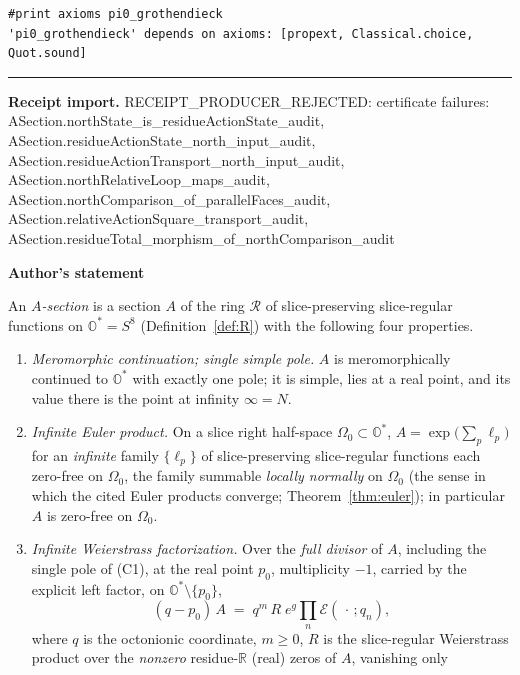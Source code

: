 \documentclass[11pt]{article}
\newcommand{\OO}{\mathbb{O}}
\newcommand{\RR}{\mathbb{R}}
\theoremstyle{plain}
\theoremstyle{definition}
\theoremstyle{remark}
\begin{document}
\begin{tcolorbox}[provenancecard,title={43. Lemma - \$\textbackslash{}pi\_0\$ of a Grothendieck construction},title after break={43. Lemma - \$\textbackslash{}pi\_0\$ of a Grothendieck construction (continued)}]
\begin{Verbatim}[breaklines=true,breakanywhere=true,fontsize=\small]
#print axioms pi0_grothendieck
'pi0_grothendieck' depends on axioms: [propext, Classical.choice, Quot.sound]
\end{Verbatim}
\medskip\hrule\medskip
\textbf{Receipt import.} \textcolor{KgtRed}{RECEIPT\_PRODUCER\_REJECTED: certificate failures: ASection.northState\_is\_residueActionState\_audit, ASection.residueActionState\_north\_input\_audit, ASection.residueActionTransport\_north\_input\_audit, ASection.northRelativeLoop\_maps\_audit, ASection.northComparison\_of\_parallelFaces\_audit, ASection.relativeActionSquare\_transport\_audit, ASection.residueTotal\_morphism\_of\_northComparison\_audit}
\end{tcolorbox}
\medskip
\begin{tcolorbox}[provenancecard,title={44. Definition - \$A\$-sections},title after break={44. Definition - \$A\$-sections (continued)}]
\textbf{Author's statement}\par
An \emph{$A$-section} is a section $A$ of the ring $\mathcal R$ of slice-preserving
slice-regular functions on $\OO^{*}=S^8$ \textup{(Definition~\ref{def:R})} with the following
four properties.
\begin{enumerate}[label=\textup{(C\arabic*)},leftmargin=3.2em]
\item \emph{Meromorphic continuation; single simple pole.} $A$ is meromorphically continued to
  $\OO^{*}$ with exactly one pole; it is simple, lies at a real point, and its value there is the
  point at infinity $\infty=N$.
\item \emph{Infinite Euler product.} On a slice right half-space $\Omega_0\subset\OO^{*}$,
  $A=\exp\!\big(\sum_p\ell_p\big)$ for an \emph{infinite} family $\{\ell_p\}$ of
  slice-preserving slice-regular functions each zero-free on $\Omega_0$, the family summable
  \emph{locally normally} on $\Omega_0$ \textup{(}the sense in which the cited Euler products
  converge; Theorem~\ref{thm:euler}\textup{)}; in particular $A$ is
  zero-free on $\Omega_0$.
\item \emph{Infinite Weierstrass factorization.} Over the \emph{full divisor} of $A$,
  including the single pole of \textup{(C1)}, at the real point $p_0$, multiplicity $-1$,
  carried by the explicit left factor, on $\OO^{*}\setminus\{p_0\}$,
  \[
    (q-p_0)\,A\;=\;q^{m}\,R\;e^{g}\prod_n\mathcal E(\,\cdot\,;q_n),
  \]
  where $q$ is the octonionic coordinate, $m\ge0$, $R$ is the slice-regular Weierstrass product
  over the \emph{nonzero} residue-$\RR$ \textup{(}real\textup{)} zeros of $A$, vanishing only

\end{enumerate}
\end{tcolorbox}
\end{document}
